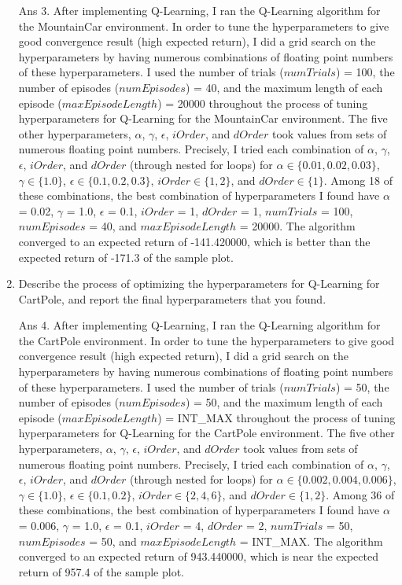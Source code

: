 \documentclass[]{article}
\begin{document}
\begin{enumerate}
	{
		\color{blue}
		Ans 3. After implementing Q-Learning, I ran the Q-Learning algorithm for the MountainCar environment. In order to tune the hyperparameters to give good convergence result (high expected return), I did a grid search on the hyperparameters by having numerous combinations of floating point numbers of these hyperparameters. I used the number of trials ($numTrials$) = 100, the number of episodes ($numEpisodes$) = 40, and the maximum length of each episode ($maxEpisodeLength$) = 20000 throughout the process of tuning hyperparameters for Q-Learning for the MountainCar environment. The five other hyperparameters, $\alpha$, $\gamma$, $\epsilon$, $iOrder$, and $dOrder$ took values from sets of numerous floating point numbers. Precisely, I tried each combination of $\alpha$, $\gamma$, $\epsilon$, $iOrder$, and $dOrder$ (through nested for loops) for $\alpha \in \{0.01, 0.02, 0.03\}$, $\gamma \in \{1.0\}$, $\epsilon \in \{0.1, 0.2, 0.3\}$, $iOrder \in \{1, 2\}$, and $dOrder \in \{1\}$. Among 18 of these combinations, the best combination of hyperparameters I found have $\alpha$ = 0.02, $\gamma$ = 1.0, $\epsilon$ = 0.1, $iOrder$ = 1, $dOrder$ =  1, $numTrials$ = 100, $numEpisodes$ = 40, and $maxEpisodeLength$ = 20000. The algorithm converged to an expected return of -141.420000, which is better than the expected return of -171.3 of the sample plot.

	}

    \item Describe the process of optimizing the hyperparameters for Q-Learning for CartPole, and report the final hyperparameters that you found.

	{
		\color{blue}
		Ans 4. After implementing Q-Learning, I ran the Q-Learning algorithm for the CartPole environment. In order to tune the hyperparameters to give good convergence result (high expected return), I did a grid search on the hyperparameters by having numerous combinations of floating point numbers of these hyperparameters. I used the number of trials ($numTrials$) = 50, the number of episodes ($numEpisodes$) = 50, and the maximum length of each episode ($maxEpisodeLength$) = INT\_MAX throughout the process of tuning hyperparameters for Q-Learning for the CartPole environment. The five other hyperparameters, $\alpha$, $\gamma$, $\epsilon$, $iOrder$, and $dOrder$ took values from sets of numerous floating point numbers. Precisely, I tried each combination of $\alpha$, $\gamma$, $\epsilon$, $iOrder$, and $dOrder$ (through nested for loops) for $\alpha \in \{0.002, 0.004, 0.006\}$, $\gamma \in \{1.0\}$, $\epsilon \in \{0.1, 0.2\}$, $iOrder \in \{2, 4, 6\}$, and $dOrder \in \{1, 2\}$. Among 36 of these combinations, the best combination of hyperparameters I found have $\alpha$ = 0.006, $\gamma$ = 1.0, $\epsilon$ = 0.1, $iOrder$ = 4, $dOrder$ =  2, $numTrials$ = 50, $numEpisodes$ = 50, and $maxEpisodeLength$ = INT\_MAX. The algorithm converged to an expected return of 943.440000, which is near the expected return of 957.4 of the sample plot.

}
\end{enumerate}
\end{document}
